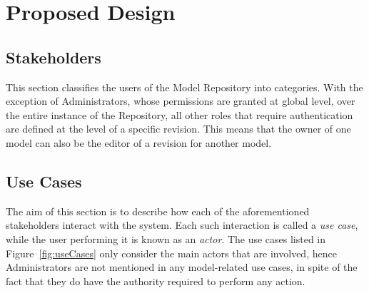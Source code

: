 \section{Proposed Design}
\label{proposedDesign}

\subsection{Stakeholders}
\label{stakeholders}
This section classifies the users of the \ddmore Model Repository into categories. With the exception of Administrators, whose permissions are granted at global level, over the entire instance of the Repository, all other roles that require authentication are defined at the level of a specific revision. This means that the owner of one model can also be the editor of a revision for another model. 


\subsection{Use Cases}
\label{useCases}
The aim of this section is to describe how each of the aforementioned stakeholders interact with the system. Each such interaction is called a \emph{use case}, while the user performing it is known as an \emph{actor}. The use cases listed in Figure~\ref{fig:useCases} only consider the main actors that are involved, hence Administrators are not mentioned in any model-related use cases, in spite of the fact that they do have the authority required to perform any action. 

